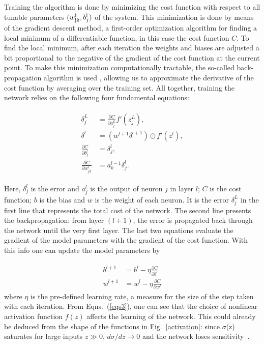 Training the algorithm is done by minimizing the cost function with respect to all tunable parameters
$(w^{\rm l}_{\rm jk}, b^{\rm l}_j)$ of the system. 
%
This minimization is done by means of the gradient descent method, a first-order optimization algorithm
for finding a local minimum of a differentiable function, in this case the cost function $C$.
%
To find the local minimum, after each iteration the weights and biases are adjusted a bit proportional
to the negative of the gradient of the cost function at the current point. 
%
To make this minimization computationally tractable, 
the so-called back-propagation algorithm is used \cite{Hecht:1992}, 
allowing us to approximate the derivative of the cost function by averaging over the training set. 
%
All together, training the network relies on the following four fundamental equations:

\begin{align}
\label{eqs3}
\begin{split}
 \delta_j^L &= \frac{\partial C}{\partial a_j^L} f'(z_j^L), 
 \\
 \delta^l &= (w^{l+1} \delta^{l+1}) \odot f'(z^l),
 \\
 \frac{\partial C}{\partial b_j^l} &= \delta_j^l,
 \\
 \frac{\partial C}{\partial w_{jk}^l} &= a_k^{l-1}\delta_j^l.
\end{split}
\end{align}

Here, $\delta_j^l$ is the error and $a_j^l$ is the output of neuron $j$ in layer $l$; 
$C$ is the cost function; $b$ is the bias and $w$ is the weight of each neuron. 
%
It is the error $\delta_j^L$ in the first line that represents the total cost of the network.
%
The second line presents the backpropagation: from layer $(l+1)$, the error is propagated
back through the network until the very first layer.
%
The last two equations evaluate the gradient of the model parameters 
with the gradient of the cost function. 
%
With this info one can update the model parameters by

\begin{align}
\begin{split}
 b^{l+1} &= b^l - \eta \frac{\partial C}{\partial b^l}
 \\
 w^{l+1} &= w^l - \eta \frac{\partial C}{\partial w^l}
\end{split}
\end{align}
where $\eta$ is the pre-defined learning rate, a measure for the size 
of the step taken with each iteration.
%
From Eqns.~(\ref{eqs3}), one can see that the choice of nonlinear 
activation function $f(z)$ affects the learning of the network. 
%
This could already be deduced from the shape of the functions in Fig.~\ref{activation}: 
since $\sigma$(z) saturates for large inputs $z\gg0$, 
$d\sigma/dz\rightarrow0$ and the network loses sensitivity~\cite{juan}.


